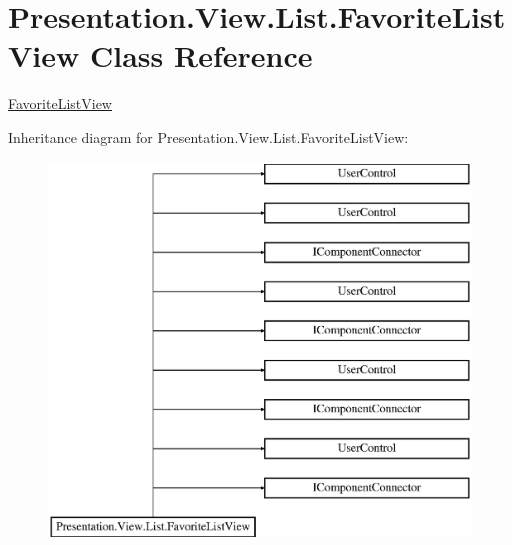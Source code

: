 \hypertarget{class_presentation_1_1_view_1_1_list_1_1_favorite_list_view}{}\section{Presentation.\+View.\+List.\+Favorite\+List\+View Class Reference}
\label{class_presentation_1_1_view_1_1_list_1_1_favorite_list_view}


\hyperlink{class_presentation_1_1_view_1_1_list_1_1_favorite_list_view}{Favorite\+List\+View}  


Inheritance diagram for Presentation.\+View.\+List.\+Favorite\+List\+View\+:\begin{figure}[H]
\begin{center}
\leavevmode
\includegraphics[height=10.000000cm]{class_presentation_1_1_view_1_1_list_1_1_favorite_list_view}
\end{center}
\end{figure}
